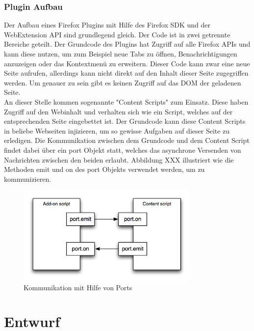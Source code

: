 \subsection{Plugin Aufbau}
Der Aufbau eines Firefox Plugins mit Hilfe des Firefox SDK und der WebExtension API sind grundlegend gleich. Der Code ist in zwei getrennte Bereiche geteilt. Der Grundcode des Plugins hat Zugriff auf alle Firefox APIs und kann diese nutzen, um zum Beispiel neue Tabs zu öffnen, Benachrichtigungen anzuzeigen oder das Kontextmenü zu erweitern. Dieser Code kann zwar eine neue Seite aufrufen, allerdings kann nicht direkt auf den Inhalt dieser Seite zugegriffen werden. Um genauer zu sein gibt es keinen Zugriff auf das DOM der geladenen Seite. \\
An dieser Stelle kommen sogenannte "Content Scripts" zum Einsatz. Diese haben Zugriff auf den Webinhalt und verhalten sich wie ein Script, welches auf der entsprechenden Seite eingebettet ist. Der Grundcode kann diese Content Scripts in beliebe Webseiten injizieren, um so gewisse Aufgaben auf dieser Seite zu erledigen. Die Kommunikation zwischen dem Grundcode und dem Content Script findet dabei über ein port Objekt statt, welches das asynchrone Versenden von Nachrichten zwischen den beiden erlaubt. Abbildung XXX illustriert wie die Methoden emit und on des port Objekts verwendet werden, um zu kommunizieren.

\begin{figure}
	\centering
	\includegraphics[width=0.8\textwidth]{Bilder/content-scripting-overview.png}
	\caption{Kommunikation mit Hilfe von Ports}
\end{figure}

\chapter{Entwurf}
